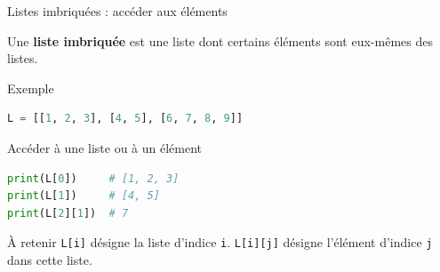\documentclass[10pt]{beamer}
\begin{document}
\begin{frame}[fragile]{Listes imbriquées : accéder aux éléments}

Une \textbf{liste imbriquée} est une liste dont certains éléments
sont eux-mêmes des listes.

\begin{exampleblock}{Exemple}
\begin{lstlisting}[language=Python]
L = [[1, 2, 3], [4, 5], [6, 7, 8, 9]]
\end{lstlisting}
\end{exampleblock}

\begin{center}
\end{center}

\pause

\begin{exampleblock}{Accéder à une liste ou à un élément}
\begin{lstlisting}[language=Python]
print(L[0])     # [1, 2, 3]
print(L[1])     # [4, 5]
print(L[2][1])  # 7
\end{lstlisting}
\end{exampleblock}

\begin{block}{À retenir}
\texttt{L[i]} désigne la liste d'indice \texttt{i}.
\texttt{L[i][j]} désigne l'élément d'indice \texttt{j}
dans cette liste.
\end{block}

\end{frame}
\end{document}
